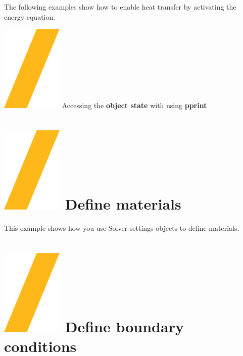 \documentclass[9pt,landscape]{article}
\begin{document}
\begin{multicols}{3}
The following examples show how to enable heat transfer by activating the energy equation.


{\includegraphics[height=\fontcharht\font`\S]{slash.png} Accessing the \textbf{object state} with using \textbf{pprint}



\vfill
\section{\includegraphics[height=\fontcharht\font`\S]{slash.png}  Define materials}
This example shows how you use Solver settings objects to define materials.

\section{\includegraphics[height=\fontcharht\font`\S]{slash.png}  Define boundary conditions}

}
\end{multicols}
\end{document}
